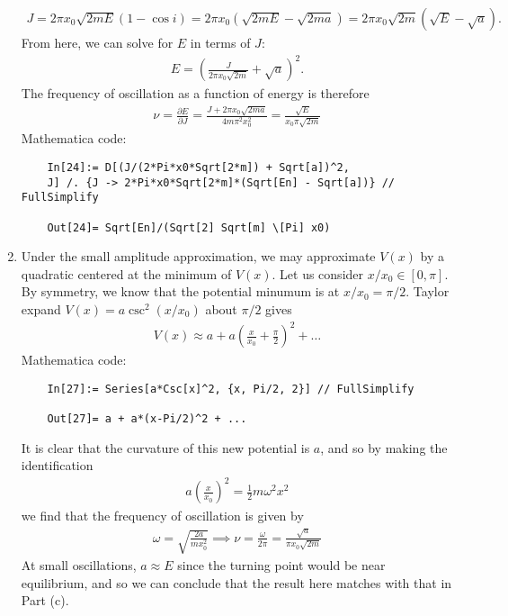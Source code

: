 \documentclass{article}
\theoremstyle{definition}
\newcommand{\p}{\partial}
\newcommand{\f}[2]{\frac{#1}{#2}}
\newcommand{\lp}{\left(}
\newcommand{\rp}{\right)}
\begin{document}
\begin{enumerate}[label=(\alph*)]
	\begin{align*}
	J = 2\pi x_0 \sqrt{2mE} (1-\cos i ) = 2\pi x_0 (\sqrt{2mE} - \sqrt{2ma}) = 2\pi x_0 \sqrt{2m} (\sqrt{E} - \sqrt{a}).
	\end{align*}
	From here, we can solve for $E$ in terms of $J$:
	\begin{align*}
	E = \lp \f{J}{2\pi x_0\sqrt{2m}} + \sqrt{a} \rp^2.
	\end{align*}
	The frequency of oscillation as a function of energy is therefore
	\begin{align*}
	\boxed{\nu = \f{\p E}{\p J} = \f{J + 2\pi x_0\sqrt{2ma}}{4m\pi^2 x_0^2} = \f{\sqrt{E}}{x_0 \pi \sqrt{2m}}}
	\end{align*}
	Mathematica code:
	\begin{lstlisting}
	In[24]:= D[(J/(2*Pi*x0*Sqrt[2*m]) + Sqrt[a])^2, 
	J] /. {J -> 2*Pi*x0*Sqrt[2*m]*(Sqrt[En] - Sqrt[a])} // FullSimplify
	
	Out[24]= Sqrt[En]/(Sqrt[2] Sqrt[m] \[Pi] x0)
	\end{lstlisting}
	
	
	
	\item Under the small amplitude approximation, we may approximate $V(x)$ by a quadratic centered at the minimum of $V(x)$. Let us consider $x/x_0 \in [0,\pi]$. By symmetry, we know that the potential minumum is at $x/x_0 = \pi/2$. Taylor expand $V(x) = a\csc^2(x/x_0)$ about $\pi/2$ gives
	\begin{align*}
	V(x)\approx a + a\lp \f{x}{x_0} + \f{\pi}{2} \rp^2 + \dots
	\end{align*}
	Mathematica code:
	\begin{lstlisting}
	In[27]:= Series[a*Csc[x]^2, {x, Pi/2, 2}] // FullSimplify
	
	Out[27]= a + a*(x-Pi/2)^2 + ...
	\end{lstlisting}
	
	It is clear that the curvature of this new potential is $a$, and so by making the identification
	\begin{align*}
	a\lp \f{x}{x_0} \rp^2 = \f{1}{2}m\omega^2 x^2 
	\end{align*}
	we find that the frequency of oscillation is given by 
	\begin{align*}
	\omega = \sqrt{\f{2a}{mx_0^2}} \implies \nu = \f{\omega}{2\pi} = \f{\sqrt{a}}{\pi x_0\sqrt{2m}}
	\end{align*}
	At small oscillations, $a\approx E$ since the turning point would be near equilibrium, and so we can conclude that the result here matches with that in Part (c). 
	
\end{enumerate}
\end{document}
